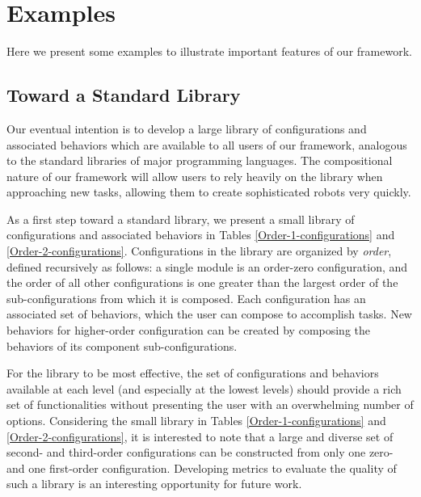 \documentclass[conference]{IEEEtran}
\theoremstyle{definition}
\begin{document}
\section{Examples}
\label{sec:examples}
Here we present some examples to illustrate important features of our framework.
\subsection{Toward a Standard Library}
Our eventual intention is to develop a large library of configurations and associated
behaviors which are available to all users of our framework, analogous to the standard
libraries of major programming languages.  The compositional nature of our framework
will allow users to rely heavily on the library when approaching new tasks, allowing
them to create sophisticated robots very quickly.

As a first step toward a standard library, we present a small library of configurations
and associated behaviors in Tables \ref{Order-1-configurations} and \ref{Order-2-configurations}.
Configurations in the library are organized by \textit{order}, defined recursively
as follows: a single module is an order-zero configuration, and the order of all
other configurations is one greater than the largest order of the sub-configurations
from which it is composed. Each configuration has an associated set of behaviors,
which the user can compose to accomplish tasks.  New behaviors for higher-order configuration can be created by composing the behaviors of its component sub-configurations.

For the library to be most effective, the set of configurations and behaviors available
 at each level (and especially at the lowest levels) should provide a rich set of
 functionalities without presenting the user with an overwhelming number of options. 
 Considering the small library in Tables \ref{Order-1-configurations} and \ref{Order-2-configurations},
 it is interested to note that a large  and diverse set of second- and third-order configurations can
be constructed from only one zero- and one first-order configuration. Developing metrics to
evaluate the quality of such a library is an interesting opportunity for future work. 
\end{document}
